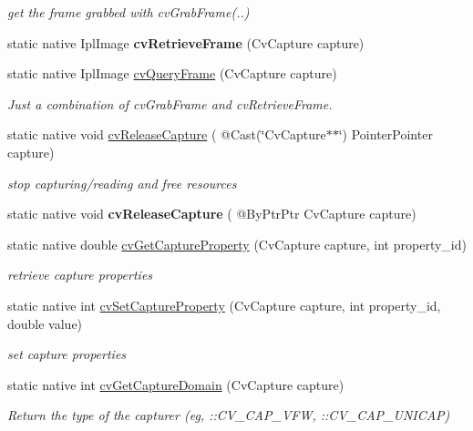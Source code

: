 \begin{DoxyCompactItemize}
\begin{DoxyCompactList}\small\item\em get the frame grabbed with cv\+Grab\+Frame(..) \end{DoxyCompactList}\item 
static native Ipl\+Image {\bfseries cv\+Retrieve\+Frame} (Cv\+Capture capture)
\item 
static native Ipl\+Image \hyperlink{group__videoio__c_ga5c8fd8eb6b93a72085abecae04eebb12}{cv\+Query\+Frame} (Cv\+Capture capture)
\begin{DoxyCompactList}\small\item\em Just a combination of cv\+Grab\+Frame and cv\+Retrieve\+Frame. \end{DoxyCompactList}\item 
static native void \hyperlink{group__videoio__c_ga74708c3e2dd50838b8626b75a7ceaf1d}{cv\+Release\+Capture} ( @Cast(\char`\"{}Cv\+Capture$\ast$$\ast$\char`\"{}) Pointer\+Pointer capture)
\begin{DoxyCompactList}\small\item\em stop capturing/reading and free resources \end{DoxyCompactList}\item 
static native void {\bfseries cv\+Release\+Capture} ( @By\+Ptr\+Ptr Cv\+Capture capture)
\item 
static native double \hyperlink{group__videoio__c_ga98ef6dab996d6b3189fc3f18046d2a44}{cv\+Get\+Capture\+Property} (Cv\+Capture capture, int property\+\_\+id)
\begin{DoxyCompactList}\small\item\em retrieve capture properties \end{DoxyCompactList}\item 
static native int \hyperlink{group__videoio__c_ga1165012821c4296388a11df431414950}{cv\+Set\+Capture\+Property} (Cv\+Capture capture, int property\+\_\+id, double value)
\begin{DoxyCompactList}\small\item\em set capture properties \end{DoxyCompactList}\item 
static native int \hyperlink{group__videoio__c_ga907965e3aedaeeb293f6b781590fa8a9}{cv\+Get\+Capture\+Domain} (Cv\+Capture capture)
\begin{DoxyCompactList}\small\item\em Return the type of the capturer (eg, \+::\+C\+V\+\_\+\+C\+A\+P\+\_\+\+V\+FW, \+::\+C\+V\+\_\+\+C\+A\+P\+\_\+\+U\+N\+I\+C\+AP) \end{DoxyCompactList}\item 
$$
\end{DoxyCompactItemize}
